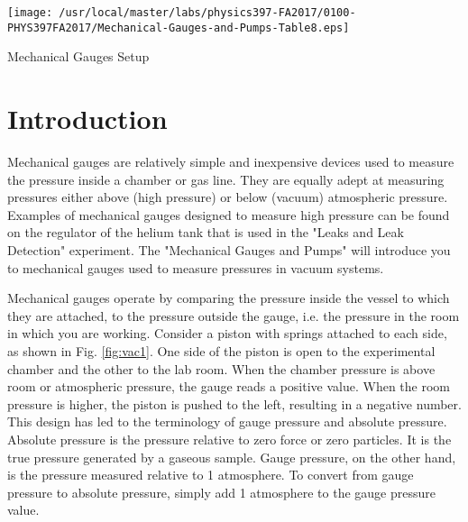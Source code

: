 \begin{marginfigure}
\texttt{[image: /usr/local/master/labs/physics397-FA2017/0100-PHYS397FA2017/Mechanical-Gauges-and-Pumps-Table8.eps]}
\caption{Mechanical Gauges Setup}
\label{fig:VACsetup1}
\end{marginfigure}

\section{Introduction}

Mechanical gauges are relatively simple and inexpensive devices used to measure the pressure inside a chamber or gas line. They are equally adept at measuring pressures either above (high pressure) or below (vacuum) atmospheric pressure. Examples of mechanical gauges designed to measure high pressure can be found on the regulator of the helium tank that is used in the "Leaks and Leak Detection" experiment. The "Mechanical Gauges and Pumps" will introduce you to mechanical gauges used to measure pressures in vacuum systems.

Mechanical gauges operate by comparing the pressure inside the vessel to which they are attached, to the pressure outside the gauge, i.e. the pressure in the room in which you are working. Consider a piston with springs attached to each side, as shown in Fig. \ref{fig:vac1}. One side of the piston is open to the experimental chamber and the other to the lab room. When the chamber pressure is above room or atmospheric pressure, the gauge reads a positive value. When the room pressure is higher, the piston is pushed to the left, resulting in a negative number. This design has led to the terminology of gauge pressure and absolute pressure. Absolute pressure is the pressure relative to zero force or zero particles. It is the true pressure generated by a gaseous sample. Gauge pressure, on the other hand, is the pressure measured relative to 1 atmosphere. To convert from gauge pressure to absolute pressure, simply add 1 atmosphere to the gauge pressure value.


